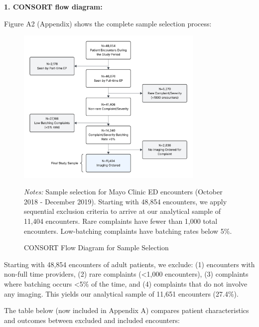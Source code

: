 \documentclass[11pt]{article}
\newcommand{\1}{\hbox{\rm 1\kern-.35em 1}}
\begin{document}
\textbf{1. CONSORT flow diagram:}

Figure A2 (Appendix) shows the complete sample selection process:

\begin{figure}[ht]
\centering
\begin{threeparttable}
\includegraphics[width=0.8\textwidth]{../outputs/figures/CONSORT.png}    
\caption{CONSORT Flow Diagram for Sample Selection}    
\label{fig:consort}    
\begin{tablenotes}
\small
\item \textit{Notes:} Sample selection for Mayo Clinic ED encounters (October 2018 - December 2019). Starting with 48,854 encounters, we apply sequential exclusion criteria to arrive at our analytical sample of 11,404 encounters. Rare complaints have fewer than 1,000 total encounters. Low-batching complaints have batching rates below 5\%.
\end{tablenotes}
\end{threeparttable}
\end{figure}

Starting with 48,854 encounters of adult patients, we exclude: (1) encounters with non-full time providers, (2) rare complaints (<1,000 encounters), (3) complaints where batching occurs <5\% of the time, and (4) complaints that do not involve any imaging. This yields our analytical sample of 11,651 encounters (27.4\%).

The table below (now included in Appendix A) compares patient characteristics and outcomes between excluded and included encounters:
\end{document}
